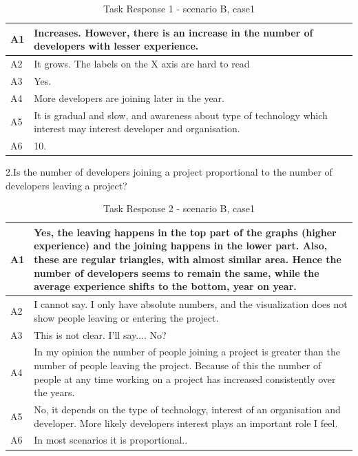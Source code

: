 \documentclass[double,12pt]{beavtex}
\begin{document}
\begin{appendices}
\begin{table}[H]
\begin{tabular}{ |p{2cm}|p{12cm}| }
 \hline
 A1 & Increases. However, there is an increase in the number of developers with lesser experience.\\
 \hline
 A2 & It grows. The labels on the X axis are hard to read
\\ \hline
 A3 & Yes.\\ \hline
 A4 & More developers are joining later in the year.\\ \hline
 A5 & It is gradual and slow, and awareness about type of technology which interest may interest developer and organisation.\\ \hline
 A6 & 10.\\
 \hline
\end{tabular}
\caption{Task Response 1 - scenario B, case1}
\label{tab:table21}
\end{table}

2.Is the number of developers joining a project proportional to the number of developers leaving a project?	

\begin{table}[H]
\begin{tabular}{ |p{2cm}|p{12cm}| }
 \hline
 A1 & Yes, the leaving happens in the top part of the graphs (higher experience) and the joining happens in the lower part. Also, these are regular triangles, with almost similar area. Hence the number of developers seems to remain the same, while the average experience shifts to the bottom, year on year.\\
 \hline
 A2 & I cannot say. I only have absolute numbers, and the visualization does not show people leaving or entering the project.\\ \hline
 A3 & This is not clear. I'll say.... No?\\ \hline
 A4 & In my opinion the number of people joining a project is greater than the number of people leaving the project. Because of this the number of people at any time working on a project has increased consistently over the years.\\ \hline
 A5 & No, it depends on the type of technology, interest of an organisation and developer. More likely developers interest plays an important role I feel.\\ \hline
 A6 & In most scenarios it is proportional..\\
 \hline
\end{tabular}
\caption{Task Response 2 - scenario B, case1}
\label{tab:table22}
\end{table}


\end{appendices}
\end{document}
